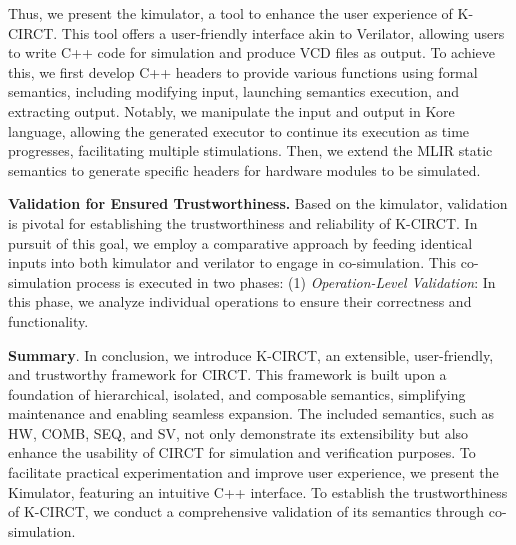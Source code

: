 Thus, we present the kimulator, a tool to enhance the user experience of K-CIRCT. This tool offers a user-friendly interface akin to Verilator, allowing users to write C++ code for simulation and produce VCD files as output. To achieve this, we first develop C++ headers to provide various functions using formal semantics, including modifying input, launching semantics execution, and extracting output. Notably, we manipulate the input and output in Kore language, allowing the generated executor to continue its execution as time progresses, facilitating multiple stimulations. Then, we extend the MLIR static semantics to generate specific headers for hardware modules to be simulated.


\smallskip
\textbf{Validation for Ensured Trustworthiness.} Based on the kimulator, validation is pivotal for establishing the trustworthiness and reliability of K-CIRCT. In pursuit of this goal, we employ a comparative approach by feeding identical inputs into both kimulator and verilator to engage in co-simulation. This co-simulation process is executed in two phases: (1) \textit{Operation-Level Validation}: In this phase, we analyze individual operations to ensure their correctness and functionality. 

\smallskip
\textbf{Summary}. In conclusion, we introduce K-CIRCT, an extensible, user-friendly, and trustworthy framework for CIRCT. This framework is built upon a foundation of hierarchical, isolated, and composable semantics, simplifying maintenance and enabling seamless expansion. The included semantics, such as HW, COMB, SEQ, and SV, not only demonstrate its extensibility but also enhance the usability of CIRCT for simulation and verification purposes. To facilitate practical experimentation and improve user experience, we present the Kimulator, featuring an intuitive C++ interface. To establish the trustworthiness of K-CIRCT, we conduct a comprehensive validation of its semantics through co-simulation. 






